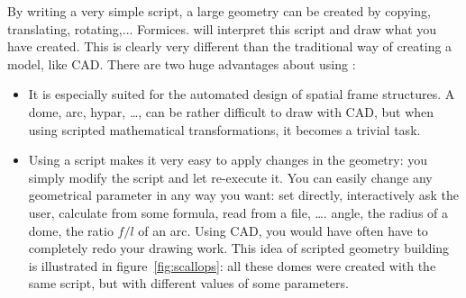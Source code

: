 By writing a very simple script, a large geometry can be created by copying, translating, rotating,... Formices. \pyformex will interpret this script and draw what you have created. This is clearly very different than the traditional way of creating a model, like CAD. There are two huge advantages about using \pyformex:
\begin{itemize}
\item It is especially suited for the automated design of spatial frame structures. A dome, arc, hypar, \dots, can be rather difficult to draw with CAD, but when using scripted mathematical transformations, it becomes a trivial task.
\item Using a script makes it very easy to apply changes in the geometry: you simply modify the script and let \pyformex re-execute it. You can easily change any geometrical parameter in any way you want: set directly, interactively ask the user, calculate from some formula, read from a file, \dots.  angle, the radius of a dome, the ratio $f/l$ of an arc. Using CAD, you would have often have to completely redo your drawing work. This idea of scripted geometry building is illustrated in figure~\ref{fig:scallops}: all these domes were created with the same script, but with different values of some parameters.
\end{itemize}
